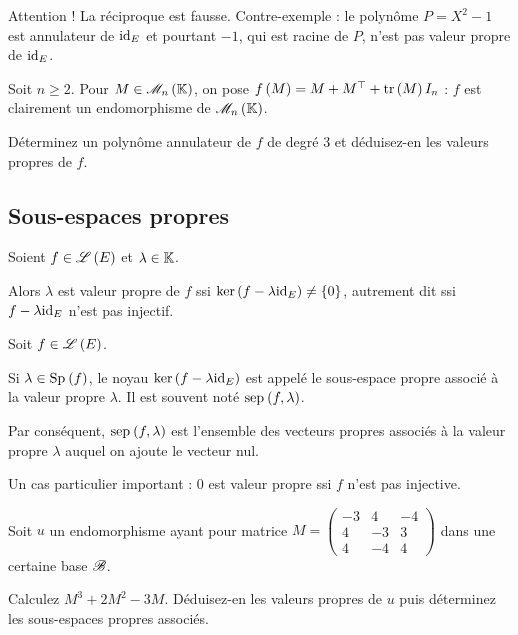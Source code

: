 \begin{rem}
Attention ! La réciproque est fausse. Contre-exemple : le polynôme \(P=X^2-1\) est annulateur de \(\mathrm{id}_{E}\) et pourtant \(-1\), qui est racine de \(P\), n'est pas valeur propre de \(\mathrm{id}_{E}\).
\end{rem}

\begin{exo}
Soit \(n\geq2\). Pour \(M\in\M{n}\), on pose \(f\left(M\right)=M+M^{\top}+\operatorname{tr}\left(M\right)I_n\) : \(f\) est clairement un endomorphisme de \(\M{n}\).

Déterminez un polynôme annulateur de \(f\) de degré \(3\) et déduisez-en les valeurs propres de \(f\).
\end{exo}

\subsection{Sous-espaces propres}

\begin{prop}
Soient \(f\in\mathscr{L}\left(E\right)\) et \(\lambda\in\mathbb{K}\).

Alors \(\lambda\) est valeur propre de \(f\) ssi \(\ker\left(f-\lambda\mathrm{id}_{E}\right)\not=\left\lbrace0\right\rbrace\), autrement dit ssi \(f-\lambda\mathrm{id}_{E}\) n'est pas injectif.
\end{prop}

\begin{defi}
Soit \(f\in\mathscr{L}\left(E\right)\).

Si \(\lambda\in\Sp{f}\), le noyau \(\ker\left(f-\lambda\mathrm{id}_{E}\right)\) est appelé le sous-espace propre associé à la valeur propre \(\lambda\). Il est souvent noté \(\sep{f}{\lambda}\).
\end{defi}

Par conséquent, \(\sep{f}{\lambda}\) est l'ensemble des vecteurs propres associés à la valeur propre \(\lambda\) auquel on ajoute le vecteur nul.

\begin{rem}
Un cas particulier important : \(0\) est valeur propre ssi \(f\) n'est pas injective.
\end{rem}

\begin{exo}
Soit \(u\) un endomorphisme ayant pour matrice \(M=\begin{pmatrix}
-3 & 4 & -4 \\
4 & -3 & 3 \\
4 & -4 & 4
\end{pmatrix}\) dans une certaine base \(\mathscr{B}\).

Calculez \(M^3+2M^2-3M\). Déduisez-en les valeurs propres de \(u\) puis déterminez les sous-espaces propres associés.
\end{exo}


